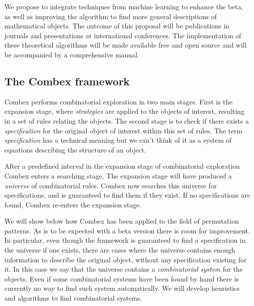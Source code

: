 \documentclass{rannis}
\newcommand{\motheralg}{\textsf{Combex}}
\theoremstyle{definition}
\begin{document}
We propose to integrate techniques from machine learning to enhance the beta,
as well as improving the algorithm to find more general descriptions
of mathematical objects.
The outcome of this proposal will be
publications in journals and presentations at international
conferences. The implementation of
these theoretical algorithms will be made available free and open source and
will be accompanied by a comprehensive manual.
\subsection*{The \motheralg{} framework}

\motheralg{} performs combinatorial
exploration in two main stages. First is the expansion stage, where \emph{strategies} are
applied to the objects of interest, resulting in a set of rules
relating the objects. The second stage is to check if there exists
a \emph{specification} for the original object of interest
within this set of rules. The term \emph{specification} has a technical meaning
but we can't think of it as a system of equations describing the structure of an object.

After a predefined interval in the expansion stage of combinatorial exploration \motheralg{} enters a searching stage. The expansion stage will have produced a \textit{universe} of combinatorial rules. \motheralg{} now searches this universe for specifications, and is guaranteed to find them if they exist. If no specifications are found, \motheralg{} re-enters the expansion stage.

We will show below how \motheralg{} has been applied to the field of permutation
patterns.
As is to be expected with a beta version there is room for improvement. In
particular, even though the
framework is guaranteed to find a specification in the universe if
one exists, there are cases where the universe contains enough information to
describe the original object, without any specification existing for it.
In this case we say that the universe contains a \emph{combinatorial system} for
the objects.
Even if some combinatorial systems have been found by hand \cite{BeanPhd}
there is currently no way to find such system automatically.
We will develop heuristics and algorithms to find combinatorial systems.
\end{document}
